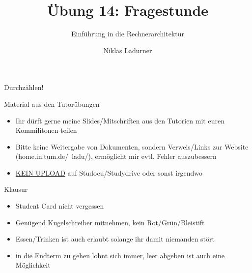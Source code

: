 \documentclass[
  german,            %
  aspectratio=169,    %
]{tumbeamer}
\title{Übung 14: Fragestunde}
\subtitle{Einführung in die Rechnerarchitektur}
\author{Niklas Ladurner}
\institute{\theChairName\\\theDepartmentName\\\theUniversityName}
\date{\DTMdisplaydate{2024}{2}{2}{-1}}
\begin{document}
\maketitle

\begin{frame}[c]{}{}
  \begin{center}
    \LARGE  Durchzählen!
  \end{center}
\end{frame}

\begin{frame}[fragile, c]{Material aus den Tutorübungen}{}
  \begin{itemize}
    \item Ihr dürft gerne meine Slides/Mitschriften aus den Tutorien mit 
    euren Kommilitonen teilen
    \item Bitte keine Weitergabe von Dokumenten, sondern Verweis/Links zur Website (home.in.tum.de/~ladu/), 
    ermöglicht mir evtl. Fehler auszubessern
    \item \underline{KEIN UPLOAD} auf Studocu/Studydrive oder sonst irgendwo
  \end{itemize}
\end{frame}

\begin{frame}[fragile, c]{Klausur}{}
\begin{itemize}
  \item Student Card nicht vergessen
  \item Genügend Kugelschreiber mitnehmen, kein Rot/Grün/Bleistift
  \item Essen/Trinken ist auch erlaubt solange ihr damit niemanden stört
  \item in die Endterm zu gehen lohnt sich immer, leer abgeben ist auch eine Möglichkeit
\end{itemize}
\end{frame}
\end{document}

